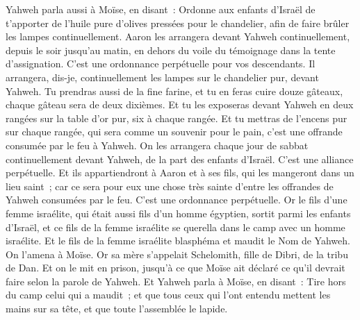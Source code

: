 \begin{multicols}{2}
\VerseOne{}Yahweh parla aussi à Moïse, en disant~:
Ordonne aux enfants d'Israël de t'apporter de l'huile pure d'olives pressées pour le chandelier, afin de faire brûler les lampes continuellement.
Aaron les arrangera devant Yahweh continuellement, depuis le soir jusqu'au matin, en dehors du voile du témoignage dans la tente d'assignation. C'est une ordonnance perpétuelle pour vos descendants.
Il arrangera, dis-je, continuellement les lampes sur le chandelier pur, devant Yahweh.
Tu prendras aussi de la fine farine, et tu en feras cuire douze gâteaux, chaque gâteau sera de deux dixièmes.
Et tu les exposeras devant Yahweh en deux rangées sur la table d'or pur, six à chaque rangée.
Et tu mettras de l'encens pur sur chaque rangée, qui sera comme un souvenir pour le pain, c'est une offrande consumée par le feu à Yahweh.
On les arrangera chaque jour de sabbat continuellement devant Yahweh, de la part des enfants d'Israël. C'est une alliance perpétuelle.
Et ils appartiendront à Aaron et à ses fils, qui les mangeront dans un lieu saint~; car ce sera pour eux une chose très sainte d'entre les offrandes de Yahweh consumées par le feu. C'est une ordonnance perpétuelle.
Or le fils d'une femme israélite, qui était aussi fils d'un homme égyptien, sortit parmi les enfants d'Israël, et ce fils de la femme israélite se querella dans le camp avec un homme israélite.
Et le fils de la femme israélite blasphéma et maudit le Nom de Yahweh. On l'amena à Moïse. Or sa mère s'appelait Schelomith, fille de Dibri, de la tribu de Dan.
Et on le mit en prison, jusqu'à ce que Moïse ait déclaré ce qu'il devrait faire selon la parole de Yahweh.
Et Yahweh parla à Moïse, en disant~:
Tire hors du camp celui qui a maudit~; et que tous ceux qui l'ont entendu mettent les mains sur sa tête, et que toute l'assemblée le lapide.

\end{multicols}
